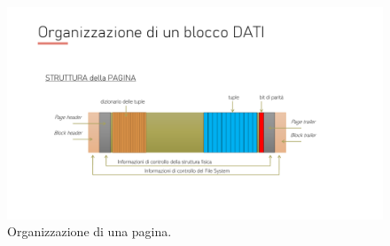 \documentclass[a4paper]{article}
\begin{document}
	\begin{figure}[!htp]
		\centering
		\includegraphics*[width=\textwidth]{img/organizzazione_pagina.pdf}
		\caption{Organizzazione di una pagina.}
	\end{figure}
\end{document}
